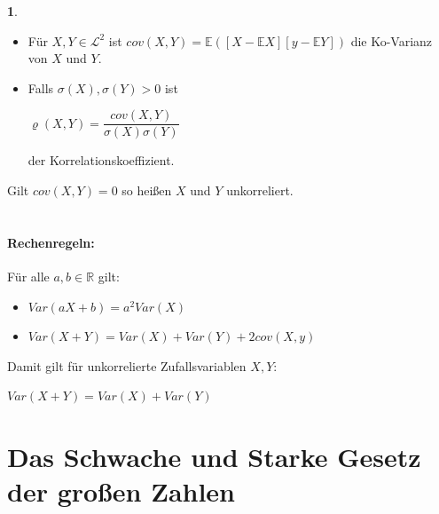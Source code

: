 \documentclass[10pt,a4paper]{report}
\numberwithin{equation}{section}
\numberwithin{figure}{section}
\theoremstyle{plain}
\theoremstyle{definition}
\newtheorem{defn}[thm]{\protect\definitionname}
\theoremstyle{remark}
\theoremstyle{plain}
\providecommand{\definitionname}{Definition}
\newcommand{\1}{ \mathbb{1} } %
\begin{document}
\begin{defn} \   %
  \begin{itemize}
  \item Für $X,Y \in \mathcal{L}^2$ ist
    $cov(X,Y)=\mathbb{E}([X-\mathbb{E}X][y-\mathbb{E}Y])$ die
    Ko-Varianz von $X$ und $Y$.
  \item Falls $\sigma(X), \sigma(Y)>0$ ist
    \begin{center}
      $\varrho(X,Y)=\dfrac{cov(X,Y)}{\sigma(X)\sigma(Y)}$
    \end{center}
    der Korrelationskoeffizient.
  \end{itemize}
  Gilt $cov(X,Y)=0$ so heißen $X$ und $Y$ unkorreliert.\\\\
\end{defn}
\paragraph{Rechenregeln:}
Für alle $a,b \in \mathbb{R}$ gilt:
\begin{itemize}
\item $Var(aX+b)=a^2Var(X)$
\item $Var(X+Y)=Var(X)+Var(Y)+2cov(X,y)$
\end{itemize}
Damit gilt für unkorrelierte Zufallsvariablen $X,Y$:
\begin{center}
  $Var(X+Y)=Var(X)+Var(Y)$
\end{center} 
\section{Das Schwache und Starke Gesetz der großen Zahlen}
\label{sec:gesetz-grosser-zahlen}
\end{document}
